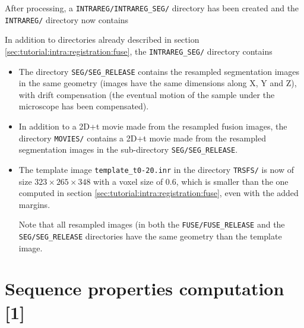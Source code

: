 After processing, a \texttt{INTRAREG/INTRAREG\_SEG/} directory has
been created and the \texttt{INTRAREG/} directory now contains

\mbox{}
\mbox{}

In addition to directories already described in section
\ref{sec:tutorial:intra:registration:fuse}, the \texttt{INTRAREG\_SEG/} directory contains
\begin{itemize}
\itemsep -1ex
\item The directory \texttt{SEG/SEG\_RELEASE} contains the resampled segmentation images
  in the same geometry (images have the same dimensions along X, Y and
  Z), with drift compensation (the eventual motion of the sample under the
  microscope has been compensated). 
\item In addition to a 2D+t movie made from the resampled fusion
  images, the directory \texttt{MOVIES/} contains a 2D+t movie made from the resampled segmentation
  images in the sub-directory \texttt{SEG/SEG\_RELEASE}.
\item The template image \texttt{template\_t0-20.inr} in the directory
  \texttt{TRSFS/} 
  is now of size $323 \times 265 \times 348$ with a voxel size of 0.6,
  which is smaller than the one computed in section
  \ref{sec:tutorial:intra:registration:fuse}, even with the added
  margins.
  
  Note that all resampled images (in both the \texttt{FUSE/FUSE\_RELEASE} and the
  \texttt{SEG/SEG\_RELEASE} directories have the same geometry than the template
  image. 
\end{itemize}



\section{Sequence properties computation [1]}
\label{sec:tutorial:properties:seg}


